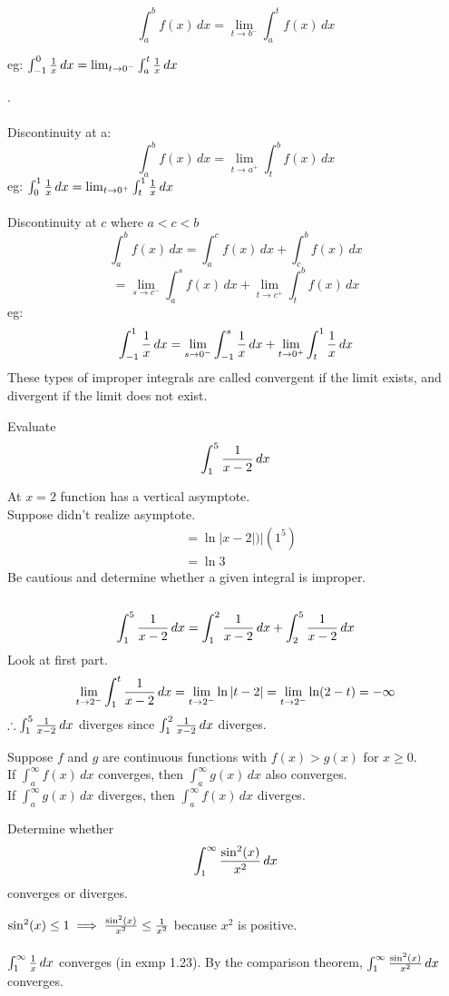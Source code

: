 \documentclass[english, 12pt]{article}
\begin{document}
\[ \int_a^b f(x)\,dx = \lim_{t \to b^-} \int_a^t f(x)\,dx \]
\begin{center}
eg: $\int_{-1}^0 \frac{1}{x}\,dx = \lim_{t \to 0^-} \int_a^t \frac{1}{x} \,dx$
\end{center}
.\\\\
Discontinuity at a:
\[ \int_a^b f(x)\,dx = \lim_{t \to a^+} \int_t^b f(x)\,dx \]
eg: $\int_{0}^1 \frac{1}{x}\,dx = \lim_{t \to 0^+} \int_t^1 \frac{1}{x} \,dx$\\\\
Discontinuity at $c$ where $a < c < b$
\[\int_a^b f(x)\,dx = \int_a^c f(x)\,dx + \int_c^b f(x)\,dx \]
\[= \lim_{s \to c^-} \int_a^s f(x)\,dx + 
\lim_{t \to c^+} \int_t^b f(x)\,dx \]
eg: \[\int_{-1}^1 \frac{1}{x}\,dx = 
\lim_{s \to 0^-} \int_{-1}^s \frac{1}{x} \,dx +
 \lim_{t \to 0^+} \int_t^1 \frac{1}{x} \,dx\]
These types of improper integrals are called convergent if the limit exists, and divergent if the limit does not exist.
\begin{exmp}
Evaluate 
\[ \int_1^5 \frac{1}{x-2}\,dx \]
\begin{sol}
At $x=2$ function has a vertical asymptote.\\
Suppose didn't realize asymptote.
\begin{align*}
& = \ln | x - 2 |)\Big|(1^5)\\
& = \ln 3 
\end{align*}
Be cautious and determine whether a given integral is improper.\\\\
\[\int_1^5 \frac{1}{x-2}\,dx = \int_1^2 \frac{1}{x-2}\,dx + \int_2^5 \frac{1}{x-2}\,dx\]
Look at first part.
\[\lim_{t \to 2^-} \int_1^t \frac{1}{x-2}\,dx = \lim_{t \to 2^-} \ln |t - 2| = \lim_{t \to 2^-} \ln (2-t)= - \infty\]
$\therefore \int_1^5 \frac{1}{x-2}\,dx$ diverges since $\int_1^2 \frac{1}{x-2}\,dx$ diverges.
\end{sol}
\end{exmp}
\begin{thrm}
Suppose $f$ and $g$ are continuous functions with $f(x) > g(x)$ for $x \geq 0$. \\
If $\int_a^{\infty} f(x)\,dx$ converges, then $\int_a^\infty g(x)\,dx$ also converges.\\
If $\int_a^\infty g(x)\,dx$ diverges, then $\int_a^\infty f(x)\,dx$ diverges.
\end{thrm}

\begin{exmp}
Determine whether 
\[ \int_1^\infty \frac{\sin^2(x)}{x^2}\,dx \] 
converges or diverges.
\begin{sol}
$\sin^2(x) \leq 1 \implies \frac{\sin^2(x)}{x^2} \leq \frac{1}{x^2}$ because $x^2$ is positive.\\\\ 
$\int_1^\infty \frac{1}{x}\,dx$ converges (in exmp 1.23). By the comparison theorem, $\int_1^\infty \frac{\sin^2(x)}{x^2}\,dx$ converges.
\end{sol}
\end{exmp}
\end{document}
